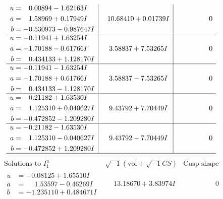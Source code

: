 \documentclass[1p]{elsarticle_modified}
\theoremstyle{definition}
\newcommand{\I}{\sqrt{-1}}
\begin{document}
$$\begin{array}{c|c|c}
\begin{aligned}
u &= \phantom{-}0.00894 - 1.62163 I \\
a &= \phantom{-}1.58969 + 0.17949 I \\
b &= -0.530973 - 0.987647 I\end{aligned}
 & \phantom{-}10.68410 + 0.01739 I & \phantom{-0.000000 } 0 \\ \hline\begin{aligned}
u &= -0.11941 + 1.63254 I \\
a &= -1.70188 - 0.61766 I \\
b &= \phantom{-}0.434133 + 1.128170 I\end{aligned}
 & \phantom{-}3.58837 + 7.53265 I & \phantom{-0.000000 } 0 \\ \hline\begin{aligned}
u &= -0.11941 - 1.63254 I \\
a &= -1.70188 + 0.61766 I \\
b &= \phantom{-}0.434133 - 1.128170 I\end{aligned}
 & \phantom{-}3.58837 - 7.53265 I & \phantom{-0.000000 } 0 \\ \hline\begin{aligned}
u &= -0.21182 + 1.63530 I \\
a &= \phantom{-}1.125310 + 0.040627 I \\
b &= -0.472852 - 1.209280 I\end{aligned}
 & \phantom{-}9.43792 + 7.70449 I & \phantom{-0.000000 } 0 \\ \hline\begin{aligned}
u &= -0.21182 - 1.63530 I \\
a &= \phantom{-}1.125310 - 0.040627 I \\
b &= -0.472852 + 1.209280 I\end{aligned}
 & \phantom{-}9.43792 - 7.70449 I & \phantom{-0.000000 } 0\\
 \hline 
 \end{array}$$\newpage$$\begin{array}{c|c|c}  
\text{Solutions to }I^u_{1}& \I (\text{vol} + \sqrt{-1}CS) & \text{Cusp shape}\\
 \hline 
\begin{aligned}
u &= -0.08125 + 1.65510 I \\
a &= \phantom{-}1.53597 - 0.46269 I \\
b &= -1.235110 + 0.484671 I\end{aligned}
 & \phantom{-}13.18670 + 3.83974 I & \phantom{-0.000000 } 0 \\ \hline\begin{aligned}

\end{aligned}
\end{array}$$
\end{document}
